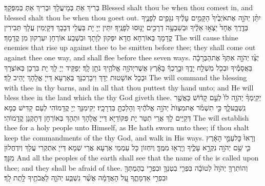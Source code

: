 {בְּרִיךְ אַתְּ בְּמֵיעֲלָךְ וּבְרִיךְ אַתְּ בְּמִפְּקָךְ׃}
{Blessed shalt thou be when thou comest in, and blessed shalt thou be when thou goest out.}{}
{יִתֵּ֨ן יְהֹוָ֤ה אֶת\maqqaf אֹיְבֶ֙יךָ֙ הַקָּמִ֣ים עָלֶ֔יךָ נִגָּפִ֖ים לְפָנֶ֑יךָ בְּדֶ֤רֶךְ אֶחָד֙ יֵצְא֣וּ אֵלֶ֔יךָ וּבְשִׁבְעָ֥ה דְרָכִ֖ים יָנ֥וּסוּ לְפָנֶֽיךָ׃}
{יִתֵּין יְיָ יָת בַּעֲלֵי דְּבָבָךְ דְּקָיְמִין עֲלָךְ תְּבִירִין קֳדָמָךְ בְּאוֹרְחָא חֲדָא יִפְּקוּן לְוָתָךְ וּבִשְׁבַע אוֹרְחָן יִעְרְקוּן מִן קֳדָמָךְ׃}
{The \lord\space will cause thine enemies that rise up against thee to be smitten before thee; they shall come out against thee one way, and shall flee before thee seven ways.}{}
{יְצַ֨ו יְהֹוָ֤ה אִתְּךָ֙ אֶת\maqqaf הַבְּרָכָ֔ה בַּאֲסָמֶ֕יךָ וּבְכֹ֖ל מִשְׁלַ֣ח יָדֶ֑ךָ וּבֵ֣רַכְךָ֔ בָּאָ֕רֶץ אֲשֶׁר\maqqaf יְהֹוָ֥ה אֱלֹהֶ֖יךָ נֹתֵ֥ן לָֽךְ׃}
{יְפַקֵּיד יְיָ לָךְ יָת בִּרְכָן בְּאוֹצְרָךְ וּבְכָל אוֹשָׁטוּת יְדָךְ וִיבָרְכִנָּךְ בְּאַרְעָא דַּייָ אֱלָהָךְ יָהֵיב לָךְ׃}
{The \lord\space will command the blessing with thee in thy barns, and in all that thou puttest thy hand unto; and He will bless thee in the land which the \lord\space thy God giveth thee.}{}
{יְקִֽימְךָ֨ יְהֹוָ֥ה לוֹ֙ לְעַ֣ם קָד֔וֹשׁ כַּאֲשֶׁ֖ר נִֽשְׁבַּֽע\maqqaf לָ֑ךְ כִּ֣י תִשְׁמֹ֗ר אֶת\maqqaf מִצְוֺת֙ יְהֹוָ֣ה אֱלֹהֶ֔יךָ וְהָלַכְתָּ֖ בִּדְרָכָֽיו׃}
{יְקִימִנָּךְ יְיָ קֳדָמוֹהִי לְעַם קַדִּישׁ כְּמָא דְּקַיֵּים לָךְ אֲרֵי תִטַּר יָת פִּקּוֹדַיָּא דַּייָ אֱלָהָךְ וּתְהָךְ בְּאוֹרְחָן דְּתָקְנָן קֳדָמוֹהִי׃}
{The \lord\space will establish thee for a holy people unto Himself, as He hath sworn unto thee; if thou shalt keep the commandments of the \lord\space thy God, and walk in His ways.}{}
{וְרָאוּ֙ כׇּל\maqqaf עַמֵּ֣י הָאָ֔רֶץ כִּ֛י שֵׁ֥ם יְהֹוָ֖ה נִקְרָ֣א עָלֶ֑יךָ וְיָֽרְא֖וּ מִמֶּֽךָּ׃}
{וְיִחְזוֹן כָּל עַמְמֵי אַרְעָא אֲרֵי שְׁמָא דַּייָ אִתְקְרִי עֲלָךְ וְיִדְחֲלוּן מִנָּךְ׃}
{And all the peoples of the earth shall see that the name of the \lord\space is called upon thee; and they shall be afraid of thee.}{}
{וְהוֹתִרְךָ֤ יְהֹוָה֙ לְטוֹבָ֔ה בִּפְרִ֧י בִטְנְךָ֛ וּבִפְרִ֥י בְהֶמְתְּךָ֖ וּבִפְרִ֣י אַדְמָתֶ֑ךָ עַ֚ל הָאֲדָמָ֔ה אֲשֶׁ֨ר נִשְׁבַּ֧ע יְהֹוָ֛ה לַאֲבֹתֶ֖יךָ לָ֥תֶת לָֽךְ׃}
